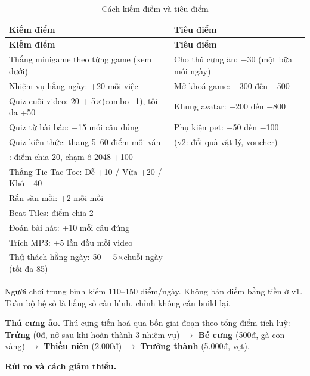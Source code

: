 \begin{longtable}{>{\raggedright\arraybackslash}p{7.6cm} >{\raggedright\arraybackslash}p{6.4cm}}
\caption{Cách kiếm điểm và tiêu điểm}
\label{tab:point-economy}\\
\toprule
\textbf{Kiếm điểm} & \textbf{Tiêu điểm} \\
\midrule
\endfirsthead
\toprule
\textbf{Kiếm điểm} & \textbf{Tiêu điểm} \\
\midrule
\endhead
\bottomrule
\endfoot
Thắng minigame theo từng game (xem dưới) & Cho thú cưng ăn: $-$30 (một bữa mỗi ngày) \\
Nhiệm vụ hằng ngày: +20 mỗi việc & Mở khoá game: $-$300 đến $-$500 \\
Quiz cuối video: 20 + 5$\times$(combo$-$1), tối đa +50 & Khung avatar: $-$200 đến $-$800 \\
Quiz từ bài báo: +15 mỗi câu đúng & Phụ kiện pet: $-$50 đến $-$100 \\
Quiz kiến thức: thang 5--60 điểm mỗi ván & (v2: đổi quà vật lý, voucher) \\
2048: điểm chia 20, chạm ô 2048 +100 &  \\
Thắng Tic-Tac-Toe: Dễ +10 / Vừa +20 / Khó +40 &  \\
Rắn săn mồi: +2 mỗi mồi &  \\
Beat Tiles: điểm chia 2 &  \\
Đoán bài hát: +10 mỗi câu đúng &  \\
Trích MP3: +5 lần đầu mỗi video &  \\
Thử thách hằng ngày: 50 + 5$\times$chuỗi ngày (tối đa 85) &  \\
\end{longtable}

Người chơi trung bình kiếm 110--150 điểm/ngày. Không bán điểm bằng tiền ở v1. Toàn bộ hệ số là hằng số cấu hình, chỉnh không cần build lại.

\textbf{Thú cưng ảo.} Thú cưng tiến hoá qua bốn giai đoạn theo tổng điểm tích luỹ: \textbf{Trứng} (0đ, nở sau khi hoàn thành 3 nhiệm vụ) $\rightarrow$ \textbf{Bé cưng} (500đ, gà con vàng) $\rightarrow$ \textbf{Thiếu niên} (2.000đ) $\rightarrow$ \textbf{Trưởng thành} (5.000đ, vẹt).

\textbf{Rủi ro và cách giảm thiểu.}

